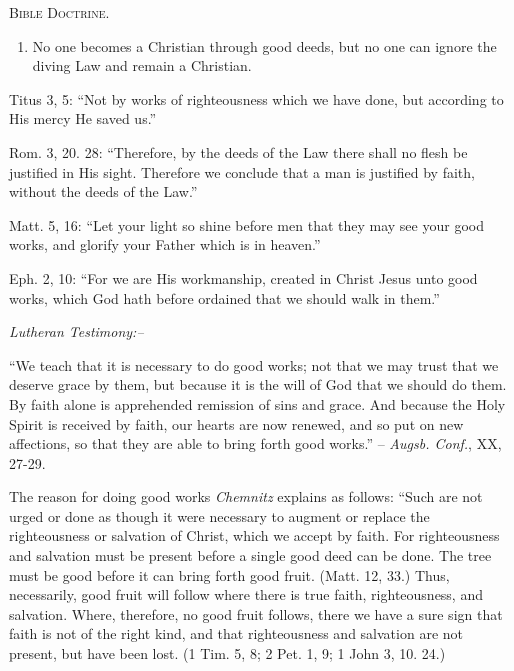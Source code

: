 \documentclass[
]{book}
\providecommand{\tightlist}{%
  \setlength{\itemsep}{0pt}\setlength{\parskip}{0pt}}
\begin{document}
\begin{center}
\textsc{Bible Doctrine.}
\end{center}

\begin{enumerate}
\def\labelenumi{\alph{enumi}.}
\setcounter{enumi}{4}
\tightlist
\item
  No one becomes a Christian through good deeds, but no one can ignore the diving Law and remain a Christian.
\end{enumerate}

Titus 3, 5: ``Not by works of righteousness which we have done, but according to His mercy He saved us.''

Rom. 3, 20. 28: ``Therefore, by the deeds of the Law there shall no flesh be justified in His sight. Therefore we conclude that a man is justified by faith, without the deeds of the Law.''

Matt. 5, 16: ``Let your light so shine before men that they may see your good works, and glorify your Father which is in heaven.''

Eph. 2, 10: ``For we are His workmanship, created in Christ Jesus unto good works, which God hath before ordained that we should walk in them.''

\begin{center}
\textsl{Lutheran Testimony:--}
\end{center}

``We teach that it is necessary to do good works; not that we may trust that we deserve grace by them, but because it is the will of God that we should do them. By faith alone is apprehended remission of sins and grace. And because the Holy Spirit is received by faith, our hearts are now renewed, and so put on new affections, so that they are able to bring forth good works.'' -- \emph{Augsb. Conf.}, XX, 27-29.

The reason for doing good works \emph{Chemnitz} explains as follows: ``Such are not urged or done as though it were necessary to augment or replace the righteousness or salvation of Christ, which we accept by faith. For righteousness and salvation must be present before a single good deed can be done. The tree must be good before it can bring forth good fruit. (Matt. 12, 33.) Thus, necessarily, good fruit will follow where there is true faith, righteousness, and salvation. Where, therefore, no good fruit follows, there we have a sure sign that faith is not of the right kind, and that righteousness and salvation are not present, but have been lost. (1 Tim. 5, 8; 2 Pet. 1, 9; 1 John 3, 10. 24.)
\end{document}
